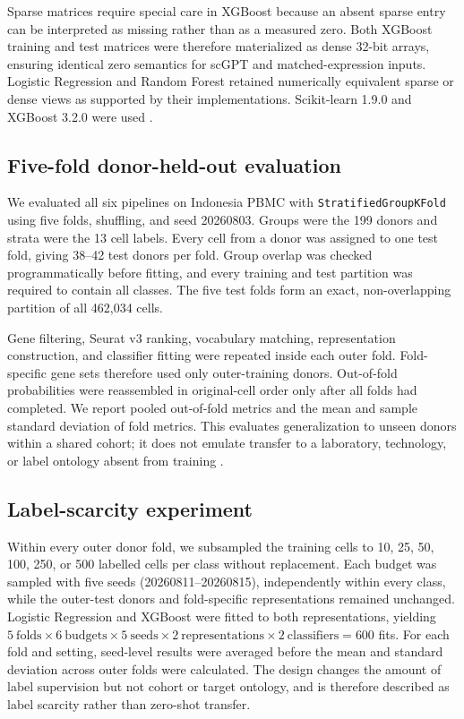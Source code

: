Sparse matrices require special care in XGBoost because an absent sparse entry can be interpreted as missing rather than as a measured zero. Both XGBoost training and test matrices were therefore materialized as dense 32-bit arrays, ensuring identical zero semantics for scGPT and matched-expression inputs. Logistic Regression and Random Forest retained numerically equivalent sparse or dense views as supported by their implementations. Scikit-learn 1.9.0 and XGBoost 3.2.0 were used \citep{Pedregosa2011,Chen2016}.

\subsection{Five-fold donor-held-out evaluation}

We evaluated all six pipelines on Indonesia PBMC with \texttt{StratifiedGroupKFold} using five folds, shuffling, and seed 20260803. Groups were the 199 donors and strata were the 13 cell labels. Every cell from a donor was assigned to one test fold, giving 38--42 test donors per fold. Group overlap was checked programmatically before fitting, and every training and test partition was required to contain all classes. The five test folds form an exact, non-overlapping partition of all 462,034 cells.

Gene filtering, Seurat v3 ranking, vocabulary matching, representation construction, and classifier fitting were repeated inside each outer fold. Fold-specific gene sets therefore used only outer-training donors. Out-of-fold probabilities were reassembled in original-cell order only after all folds had completed. We report pooled out-of-fold metrics and the mean and sample standard deviation of fold metrics. This evaluates generalization to unseen donors within a shared cohort; it does not emulate transfer to a laboratory, technology, or label ontology absent from training \citep{Roberts2017}.

\subsection{Label-scarcity experiment}

Within every outer donor fold, we subsampled the training cells to 10, 25, 50, 100, 250, or 500 labelled cells per class without replacement. Each budget was sampled with five seeds (20260811--20260815), independently within every class, while the outer-test donors and fold-specific representations remained unchanged. Logistic Regression and XGBoost were fitted to both representations, yielding $5\ \text{folds}\times6\ \text{budgets}\times5\ \text{seeds}\times2\ \text{representations}\times2\ \text{classifiers}=600$ fits. For each fold and setting, seed-level results were averaged before the mean and standard deviation across outer folds were calculated. The design changes the amount of label supervision but not cohort or target ontology, and is therefore described as label scarcity rather than zero-shot transfer.

